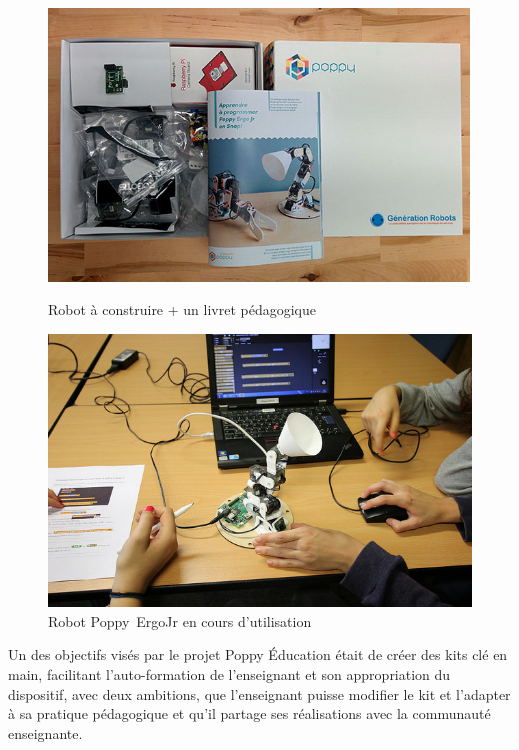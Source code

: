     \begin{figure}[!h]
    \begin{minipage}{0.47\linewidth}
        \centering
        \includegraphics[width=\linewidth]{Figures/Poppy-Box}
        \caption{\label{kit} Robot à construire + un livret pédagogique~}
    \end{minipage}\hfill
    \begin{minipage}{0.47\linewidth}
        \centering
        \includegraphics[width=\linewidth]{Figures/Poppy-ergo_at_work}
        \caption{\label{ergo} Robot Poppy~ErgoJr en cours d'utilisation}
    \end{minipage}
    \end{figure}\par%
    Un des objectifs visés par le projet Poppy Éducation était de créer des kits clé en main, facilitant l'auto-formation de l'enseignant et son appropriation du dispositif, avec deux ambitions, que l'enseignant puisse modifier le kit et l’adapter à sa pratique pédagogique et qu’il partage ses réalisations avec la communauté enseignante.
